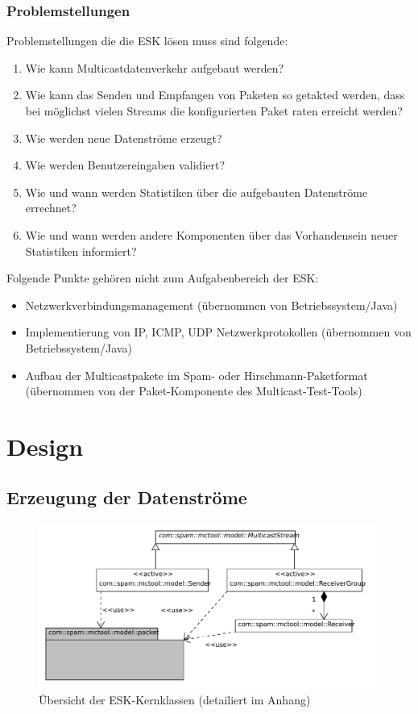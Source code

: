 \subsection{Problemstellungen}
Problemstellungen die die ESK lösen muss sind folgende:
\begin{enumerate}
  \item Wie kann Multicastdatenverkehr aufgebaut werden?
  \item Wie kann das Senden und Empfangen von Paketen so getakted werden, dass
  bei möglichst vielen Streams die konfigurierten Paket raten erreicht
  werden?
  \item Wie werden neue Datenströme erzeugt?
  \item Wie werden Benutzereingaben validiert?
  \item Wie und wann werden Statistiken über die aufgebauten Datenströme
  errechnet?
  \item Wie und wann werden andere Komponenten über das Vorhandensein neuer
  Statistiken informiert?
\end{enumerate}

Folgende Punkte gehören nicht zum Aufgabenbereich der ESK:
\begin{itemize}
  \item Netzwerkverbindungsmanagement (übernommen von Betriebssystem/Java)
  \item Implementierung von IP, ICMP, UDP Netzwerkprotokollen (übernommen von
  Betriebssystem/Java)
  \item Aufbau der Multicastpakete im Spam- oder Hirschmann-Paketformat
  (übernommen von der Paket-Komponente des Multicast-Test-Tools)
\end{itemize}

\chapter{Design}

\section{Erzeugung der Datenströme}

\begin{figure}[H]
\center
\includegraphics[width=15cm]{images/SR_ov.pdf}
\caption{Übersicht der ESK-Kernklassen (detailiert im Anhang)}
\end{figure}

